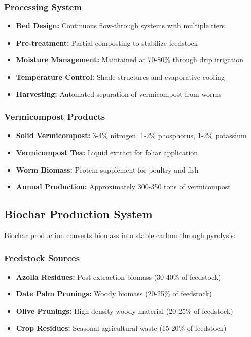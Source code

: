 \subsubsection{Processing System}
\begin{itemize}
    \item \textbf{Bed Design:} Continuous flow-through systems with multiple tiers
    \item \textbf{Pre-treatment:} Partial composting to stabilize feedstock
    \item \textbf{Moisture Management:} Maintained at 70-80\% through drip irrigation
    \item \textbf{Temperature Control:} Shade structures and evaporative cooling
    \item \textbf{Harvesting:} Automated separation of vermicompost from worms
\end{itemize}

\subsubsection{Vermicompost Products}
\begin{itemize}
    \item \textbf{Solid Vermicompost:} 3-4\% nitrogen, 1-2\% phosphorus, 1-2\% potassium
    \item \textbf{Vermicompost Tea:} Liquid extract for foliar application
    \item \textbf{Worm Biomass:} Protein supplement for poultry and fish
    \item \textbf{Annual Production:} Approximately 300-350 tons of vermicompost
\end{itemize}

\subsection{Biochar Production System}

Biochar production converts biomass into stable carbon through pyrolysis:

\subsubsection{Feedstock Sources}
\begin{itemize}
    \item \textbf{Azolla Residues:} Post-extraction biomass (30-40\% of feedstock)
    \item \textbf{Date Palm Prunings:} Woody biomass (20-25\% of feedstock)
    \item \textbf{Olive Prunings:} High-density woody material (20-25\% of feedstock)
    \item \textbf{Crop Residues:} Seasonal agricultural waste (15-20\% of feedstock)
\end{itemize}

